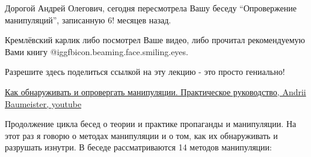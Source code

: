  
 
 
 
 
\zzSecCmt

\begin{itemize} %

Дорогой Андрей Олегович, сегодня пересмотрела Вашу беседу \enquote{Опровержение
манипуляций}, записанную 6! месяцев назад.

Кремлёвский карлик либо посмотрел Ваше видео, либо прочитал рекомендуемую Вами
книгу @igg{fbicon.beaming.face.smiling.eyes}.

Разрешите здесь поделиться ссылкой на эту лекцию - это просто гениально!

\href{https://youtu.be/I46SJGqotJ8}{%
Как обнаруживать и опровергать манипуляции. Практическое руководство, %
Andrii Baumeister, youtube%
}

Продолжение цикла бесед о теории и практике пропаганды и манипуляции. На этот
раз я говорю о методах манипуляции и о том, как их обнаруживать и разрушать
изнутри. В беседе рассматриваются 14 методов манипуляции: 


\end{itemize}
